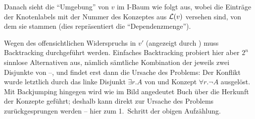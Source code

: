 \documentclass[fontsize=11pt, twoside=false, numbers=autoenddot]{scrbook}
\begin{document}
%
Danach sieht die "`Umgebung"' von $v$ im I-Baum wie folgt aus,
wobei die Einträge der Knotenlabels mit der Nummer des Konzeptes aus $\mathcal{L}(v)$
versehen sind, von dem sie stammen (dies repräsentiert die "`Dependenzmenge"').
%
\begin{center}
\end{center}
%
Wegen des offensichtlichen Widerspruchs in $v'$ (angezeigt durch \lightning)
muss Backtracking durchgeführt werden.
Einfaches Backtracking probiert hier aber $2^n$ sinnlose Alternativen aus,
nämlich sämtliche Kombination der jeweils zwei Disjunkte von --,
und findet erst dann die Ursache des Problems:
Der Konflikt wurde letztlich durch das linke Disjunkt $\exists r.A$ von 
und Konzept $\forall r.\lnot A$  ausgelöst.
Mit Backjumping hingegen wird wie im Bild angedeutet Buch über die Herkunft der Konzepte geführt; deshalb kann direkt zur Ursache des Problems zurückgesprungen werden -- hier zum 1.\ Schritt der obigen Aufzählung.
\end{document}
